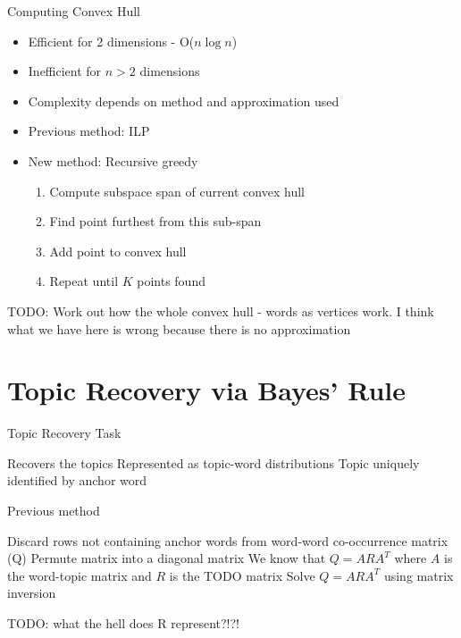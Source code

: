 \documentclass{lecture}
\begin{document}
\begin{plain}{Computing Convex Hull}
\begin{itemize}
\item Efficient for 2 dimensions - O($n\log{n}$)
\item Inefficient for $n>2$ dimensions
\item Complexity depends on method and approximation used
\item Previous method: ILP
\item New method: Recursive greedy
\begin{enumerate}
\item Compute subspace span of current convex hull
\item Find point furthest from this sub-span
\item Add point to convex hull
\item Repeat until $K$ points found
\end{enumerate}
\end{itemize}
TODO: Work out how the whole convex hull - words as vertices work. I think what we have here is wrong because there is no approximation
\end{plain}

\section[Topic Recovery]{Topic Recovery via Bayes' Rule}
\begin{plain}{Topic Recovery Task}
\begin{itemize}
\p Recovers the topics
\p Represented as topic-word distributions
\p Topic uniquely identified by anchor word
\end{itemize}
\end{plain}

\begin{plain}{Previous method}
\begin{enumerate}
\p Discard rows not containing anchor words from word-word co-occurrence matrix (Q)
\p Permute matrix into a diagonal matrix
\p We know that $Q=ARA^T$ where $A$ is the word-topic matrix and $R$ is the TODO matrix
\p Solve $Q = ARA^T$ using matrix inversion
\end{enumerate}
TODO: what the hell does R represent?!?!
\end{plain}
\end{document}
